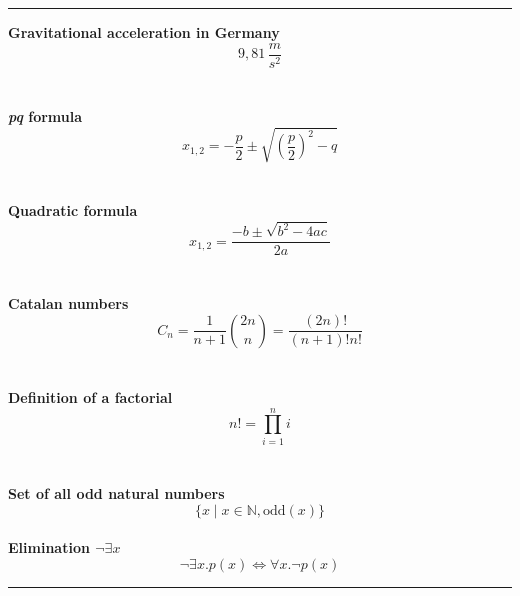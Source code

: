 \documentclass[a4paper, ngerman]{report}
\begin{document}
\thispagestyle{empty}

\hrule
\begin{center}

\textbf{Gravitational acceleration in Germany}
$$9,81\,\frac{m}{s^2}$$ \\
~ \\

\textbf {\textit{pq} formula}
$$x_{1,2} = - \frac{p}{2} \pm \sqrt{\left(\frac{p}{2}\right)^2 - q}$$ \\
~ \\

\textbf{Quadratic formula} 
$$x_{1,2} = \frac{-b \pm \sqrt{b^2 - 4ac}}{2a}$$ \\
~ \\

\textbf{Catalan numbers}
\begin{equation*} C_n = \frac{1}{n+1} {2n \choose n} = \frac{(2n)!}{(n+1)!n!} \end{equation*} \\
~ \\

\textbf{Definition of a factorial} 
$$n! = \prod_{i=1}^{n} i$$ \\
~ \\

\textbf{Set of all odd natural numbers}
$$\{ x \mid x \in \mathds{N}, \text{odd}(x) \}$$
~ \\

\textbf{Elimination $\neg\exists x$}
$$\neg\exists x . p(x) \Leftrightarrow \forall x . \neg p(x)$$
\end{center}

\hrule
\end{document}
